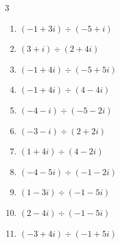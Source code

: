 \begin{multicols}{3}
\begin{enumerate}

  \item $\displaystyle (-1+3i)\div(-5+i)$


  \item $\displaystyle (3+i)\div(2+4i)$


  \item $\displaystyle (-1+4i)\div(-5+5i)$


  \item $\displaystyle (-1+4i)\div(4-4i)$


  \item $\displaystyle (-4-i)\div(-5-2i)$


  \item $\displaystyle (-3-i)\div(2+2i)$


  \item $\displaystyle (1+4i)\div(4-2i)$


  \item $\displaystyle (-4-5i)\div(-1-2i)$


  \item $\displaystyle (1-3i)\div(-1-5i)$


\columnbreak %

  \item $\displaystyle (2-4i)\div(-1-5i)$


  \item $\displaystyle (-3+4i)\div(-1+5i)$



\end{enumerate}
\end{multicols}
